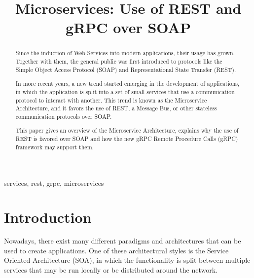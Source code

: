 \documentclass[conference]{IEEEtran}
\begin{document}


\title{Microservices: Use of REST and gRPC over SOAP}

\author{
\and
{}
}

\maketitle

\begin{abstract}

Since the induction of Web Services into modern applications, their usage has grown. Together with them, the general public was first introduced to protocols like the Simple Object Access Protocol (SOAP) and Representational State Transfer (REST).

In more recent years, a new trend started emerging in the development of applications, in which the application is split into a set of small services that use a communication protocol to interact with another. This trend is known as the Microservice Architecture, and it favors the use of REST, a Message Bus, or other stateless communication protocols over SOAP.

This paper gives an overview of the Microservice Architecture, explains why the use of REST is favored over SOAP and how the new gRPC Remote Procedure Calls (gRPC) framework may support them.

\end{abstract}

\begin{IEEEkeywords}
services, rest, grpc, microservices
\end{IEEEkeywords}

\section{Introduction}

Nowadays, there exist many different paradigms and architectures that can be used to create applications. One of these architectural styles is the Service Oriented Architecture (SOA), in which the functionality is split between multiple services that may be run locally or be distributed around the network.
\end{document}
